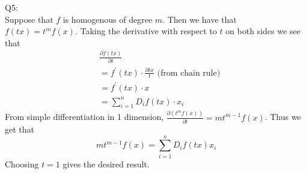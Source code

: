 \documentclass[letterpaper]{article}
\begin{document}
 
Q5:\\ Suppose that $f$ is homogenous of degree $m$. Then we have that $f(tx) = t^m f(x)$. Taking the derivative with respect to $t$ on both sides we see that
\begin{align*}
   & \frac{\partial f(tx)}{\partial t}
   \\ & = f^\prime (tx) \cdot \frac{\partial tx}{t} \text{ (from chain rule)}
   \\ & = f^\prime (tx) \cdot x
   \\ & = \sum_{i=1}^n D_i f(tx)\cdot x_i
\end{align*} From simple differentiation in 1 dimension, $\frac{\partial (t^m f(x))}{\partial t} = m t^{m-1}f(x)$. Thus we get that $$mt^{m-1}f(x) = \sum_{i=1}^n D_i f(tx) x_i$$ Choosing $t=1$ gives the desired result. 
\end{document}
